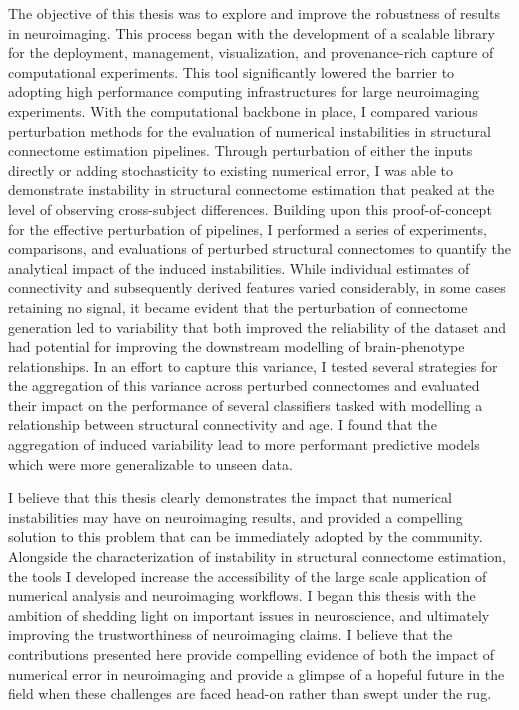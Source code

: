 The objective of this thesis was to explore and improve the robustness of results in neuroimaging. This process
began with the development of a scalable library for the deployment, management, visualization, and
provenance-rich capture of computational experiments. This tool significantly lowered the barrier to adopting high
performance computing infrastructures for large neuroimaging experiments. With the computational backbone in place,
I compared various perturbation methods for the evaluation of numerical instabilities in structural connectome
estimation pipelines. Through perturbation of either the inputs directly or adding stochasticity to existing
numerical error, I was able to demonstrate instability in structural connectome estimation that peaked at the level
of observing cross-subject differences. Building upon this proof-of-concept for the effective perturbation of
pipelines, I performed a series of experiments, comparisons, and evaluations of perturbed structural connectomes to
quantify the analytical impact of the induced instabilities. While individual estimates of connectivity and
subsequently derived features varied considerably, in some cases retaining no signal, it became evident that the
perturbation of connectome generation led to variability that both improved the reliability of the dataset and had
potential for improving the downstream modelling of brain-phenotype relationships. In an effort to capture this
variance, I tested several strategies for the aggregation of this variance across perturbed connectomes and
evaluated their impact on the performance of several classifiers tasked with modelling a relationship between
structural connectivity and age. I found that the aggregation of induced variability lead to more performant
predictive models which were more generalizable to unseen data.

I believe that this thesis clearly demonstrates the impact that numerical instabilities may have on neuroimaging
results, and provided a compelling solution to this problem that can be immediately adopted by the community.
Alongside the characterization of instability in structural connectome estimation, the tools I developed increase the
accessibility of the large scale application of numerical analysis and neuroimaging workflows. I began this thesis
with the ambition of shedding light on important issues in neuroscience, and ultimately improving the trustworthiness
of neuroimaging claims. I believe that the contributions presented here provide compelling evidence of both the
impact of numerical error in neuroimaging and provide a glimpse of a hopeful future in the field when these
challenges are faced head-on rather than swept under the rug.

